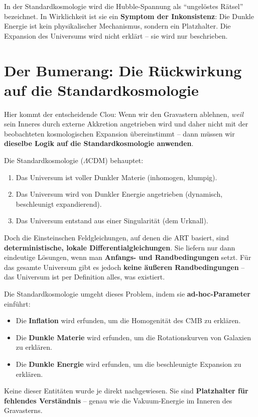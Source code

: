\documentclass[12pt,a4paper]{article}
\begin{document}
In der Standardkosmologie wird die Hubble-Spannung als \enquote{ungelöstes Rätsel} bezeichnet. In Wirklichkeit ist sie ein \textbf{Symptom der Inkonsistenz}: Die Dunkle Energie ist kein physikalischer Mechanismus, sondern ein Platzhalter. Die Expansion des Universums wird nicht erklärt – sie wird nur beschrieben.

\section{Der Bumerang: Die Rückwirkung auf die Standardkosmologie}

Hier kommt der entscheidende Clou: Wenn wir den Gravastern ablehnen, \emph{weil} sein Inneres durch externe Akkretion angetrieben wird und daher nicht mit der beobachteten kosmologischen Expansion übereinstimmt – dann müssen wir \textbf{dieselbe Logik auf die Standardkosmologie anwenden}.

Die Standardkosmologie ($\Lambda$CDM) behauptet:
\begin{enumerate}
    \item Das Universum ist voller Dunkler Materie (inhomogen, klumpig).
    \item Das Universum wird von Dunkler Energie angetrieben (dynamisch, beschleunigt expandierend).
    \item Das Universum entstand aus einer Singularität (dem Urknall).
\end{enumerate}

Doch die Einsteinschen Feldgleichungen, auf denen die ART basiert, sind \textbf{deterministische, lokale Differentialgleichungen}. Sie liefern nur dann eindeutige Lösungen, wenn man \textbf{Anfangs- und Randbedingungen} setzt. Für das gesamte Universum gibt es jedoch \textbf{keine äußeren Randbedingungen} – das Universum ist per Definition alles, was existiert.

Die Standardkosmologie umgeht dieses Problem, indem sie \textbf{ad-hoc-Parameter} einführt:
\begin{itemize}
    \item Die \textbf{Inflation} wird erfunden, um die Homogenität des CMB zu erklären.
    \item Die \textbf{Dunkle Materie} wird erfunden, um die Rotationskurven von Galaxien zu erklären.
    \item Die \textbf{Dunkle Energie} wird erfunden, um die beschleunigte Expansion zu erklären.
\end{itemize}

Keine dieser Entitäten wurde je direkt nachgewiesen. Sie sind \textbf{Platzhalter für fehlendes Verständnis} – genau wie die Vakuum-Energie im Inneren des Gravasterns.
\end{document}
